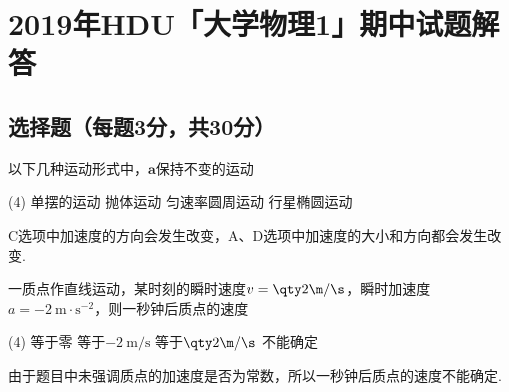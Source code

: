 \chapter*{2019年\textsf{HDU}「大学物理1」期中试题解答}



\section{选择题（每题3分，共30分）}

\begin{problem}
    以下几种运动形式中，$\bm a$保持不变的运动
    \begin{tasks}(4)
        \task 单摆的运动
        \task[\true] 抛体运动
        \task 匀速率圆周运动
        \task 行星椭圆运动
    \end{tasks}
\end{problem}
\begin{solution}
    C选项中加速度的方向会发生改变，A、D选项中加速度的大小和方向都会发生改变.
\end{solution}

\begin{problem}
    一质点作直线运动，某时刻的瞬时速度$v=\qty2{\m/\s}$，瞬时加速度$a=\qty{-2}{\m\cdot\s^{-2}}$，则一秒钟后质点的速度
    \begin{tasks}(4)
        \task 等于零
        \task 等于$\qty{-2}{\m/\s}$
        \task 等于$\qty2{\m/\s}$
        \task[\true] 不能确定
    \end{tasks}
\end{problem}
\begin{solution}
    由于题目中未强调质点的加速度是否为常数，所以一秒钟后质点的速度不能确定.
\end{solution}

